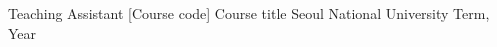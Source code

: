 

\begin{cventries}

  \cventry
    {Teaching Assistant} %
    {[Course code] Course title} %
    {Seoul National University} %
    {Term, Year} %
    {}

\end{cventries}
